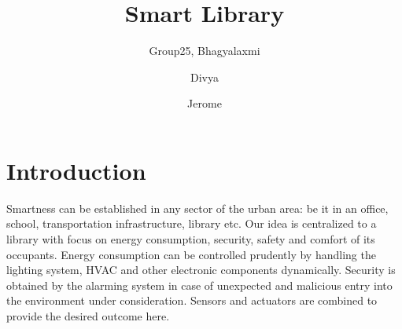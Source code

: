 \documentclass[runningheads]{llncs}
\begin{document}
%
\title{Smart Library}

\author{Group25, Bhagyalaxmi \and
Divya \and
Jerome}

%
\maketitle              %
%

\section{Introduction}
Smartness can be established in any sector of the urban area: be it in an office, school, transportation infrastructure, library etc. Our idea is centralized to a library with focus on energy consumption, security, safety and comfort of its occupants. 
Energy consumption can be controlled prudently by handling the lighting system, HVAC and other electronic components dynamically. Security is obtained by the alarming system in case of unexpected and malicious entry into the environment under consideration. 
Sensors and actuators are combined to provide the desired outcome here.
\end{document}
